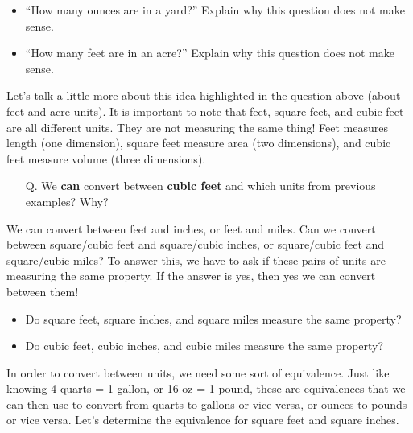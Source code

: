 \documentclass{ximera}
\begin{document}
\begin{exploration}
\begin{itemize}
\item“How many ounces are in a yard?” Explain why this question does not make sense.
\item“How many feet are in an acre?” Explain why this question does not make sense.
\end{itemize}
Let’s talk a little more about this idea highlighted in the question above (about feet and acre units).  It is important to note that feet, square feet, and cubic feet are all different units.  They are not measuring the same thing!  Feet measures length (one dimension), square feet measure area (two dimensions), and cubic feet measure volume (three dimensions).
\begin{enumerate}
	\item[Q.] We \textbf{can} convert between \textbf{cubic feet} and {which units} from previous examples?  Why?
\end{enumerate}
We can convert between feet and inches, or feet and miles.  Can we convert between square/cubic feet and square/cubic inches, or square/cubic feet and square/cubic miles?  To answer this, we have to ask if these pairs of units are measuring the same property.  If the answer is yes, then yes we can convert between them!
\begin{itemize}
\item Do square feet, square inches, and square miles measure the same property?
\item Do cubic feet, cubic inches, and cubic miles measure the same property?
\end{itemize}
In order to convert between units, we need some sort of equivalence.  Just like knowing 4 quarts = 1 gallon, or 16 oz = 1 pound, these are equivalences that we can then use to convert from quarts to gallons or vice versa, or ounces to pounds or vice versa.  Let’s determine the equivalence for square feet and square inches.
\begin{image}

\end{image}
\end{exploration}
\end{document}
